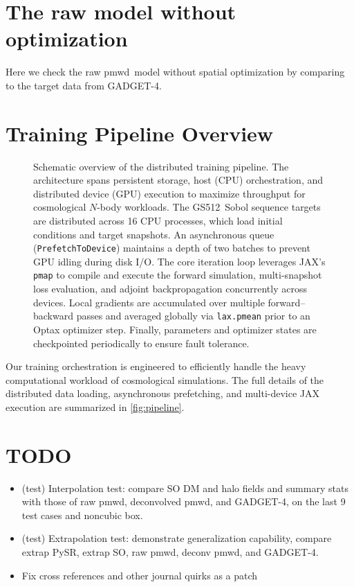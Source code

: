 \documentclass[modern, trackchanges, dvipsnames]{aastex631}
\newcommand{\pmwd}{{\usefont{T1}{nova}{m}{sl}pmwd}}
\newcommand{\GADGET}{{{\fontsize{10pt}{12pt}\selectfont GADGET}-4}}
\newcommand{\GSDATA}{{GS512}}
\begin{document}
\section{The raw model without optimization}
Here we check the raw \pmwd\ model without spatial optimization by
comparing to the target data from \GADGET.



\section{Training Pipeline Overview}

\begin{figure}
  \centering
  
  \caption{Schematic overview of the distributed training pipeline.
  The architecture spans persistent storage, host (CPU) orchestration, and
  distributed device (GPU) execution to maximize throughput for cosmological
  $N$-body workloads.
  The \GSDATA\ Sobol sequence targets are distributed across 16 CPU processes,
  which load initial conditions and target snapshots.
  An asynchronous queue (\texttt{PrefetchToDevice}) maintains a depth of two
  batches to prevent GPU idling during disk I/O.
  The core iteration loop leverages JAX's \texttt{pmap} to compile and execute
  the forward simulation, multi-snapshot loss evaluation, and adjoint
  backpropagation concurrently across devices.
  Local gradients are accumulated over multiple forward--backward passes and
  averaged globally via \texttt{lax.pmean} prior to an Optax optimizer step.
  Finally, parameters and optimizer states are checkpointed periodically to
  ensure fault tolerance.}
  \label{fig:pipeline}
\end{figure}

Our training orchestration is engineered to efficiently handle the heavy
computational workload of cosmological simulations.
The full details of the distributed data loading, asynchronous prefetching, and
multi-device JAX execution are summarized in \autoref{fig:pipeline}.




\section*{TODO}
\begin{itemize}
\item (test) Interpolation test: compare SO DM and halo fields and
  summary stats with those of raw pmwd, deconvolved pmwd, and \GADGET,
  on the last 9 test cases and noncubic box.
\item (test) Extrapolation test: demonstrate generalization capability,
  compare extrap PySR, extrap SO, raw pmwd, deconv pmwd, and \GADGET.
\item Fix cross references and other journal quirks as a patch
\end{itemize}
\end{document}
